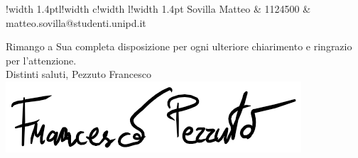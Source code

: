 \documentclass[a4paper,12pt]{article}
\newcommand\VRule[1][\arrayrulewidth]{\vrule width #1}
\begin{document}
\begin{titlepage}
\begin{center}
\begin{table}[H]
\begin{tabular}{!{\VRule[1.4pt]}l!{\VRule}c!{\VRule}l!{\VRule[1.4pt]}}
					Sovilla Matteo & 1124500 & matteo.sovilla@studenti.unipd.it \\
				\end{tabular}
			\end{table}
		\end{center}
		\vspace{1.4cm}
		Rimango a Sua completa disposizione per ogni ulteriore chiarimento e ringrazio per l'attenzione.\\
		\vspace{0.8cm}
		Distinti saluti,
		\flushright Pezzuto Francesco\\
		\vspace{0.4cm}
		\includegraphics[scale=0.5]{../../../Immagini/Firme/FrancescoPezzuto.png}
	\end{titlepage}
\end{document}
